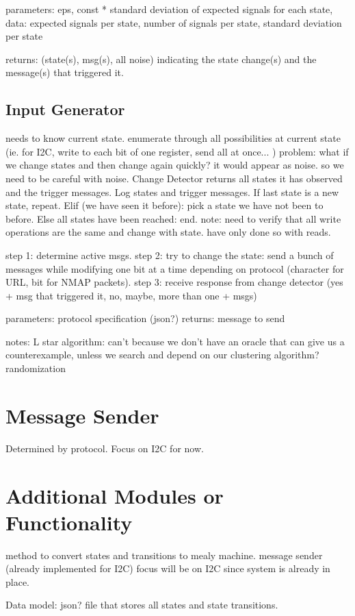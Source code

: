 \documentclass[11pt, a4paper]{article}
\begin{document}
parameters: eps, const * standard deviation of expected signals for each state,
data: expected signals per state, number of signals per state, standard deviation per state

returns: (state(s), msg(s), all noise) indicating the state change(s) and the message(s) that triggered it.

\subsection*{Input Generator}

needs to know current state.
enumerate through all possibilities at current state (ie. for I2C, write to each bit of one register, send all at once... )
problem: what if we change states and then change again quickly? it would appear as noise. so we need to be careful with noise.
Change Detector returns all states it has observed and the trigger messages.
Log states and trigger messages.
If last state is a new state, repeat. 
Elif (we have seen it before): pick a state we have not been to before.
Else all states have been reached: end.
note: need to verify that all write operations are the same and change with state. have only done so with reads.

step 1: determine active msgs.
step 2: try to change the state: send a bunch of messages while modifying one bit at a time depending on protocol (character for URL, bit for NMAP packets).
step 3: receive response from change detector (yes + msg that triggered it, no, maybe, more than one + msgs)

parameters: protocol specification (json?)
returns: message to send

notes:
L star algorithm: can't because we don't have an oracle that can give us a counterexample, unless we search and depend on our clustering algorithm?
randomization

\section*{Message Sender}
Determined by protocol.
Focus on I2C for now.

\section*{Additional Modules or Functionality}
method to convert states and transitions to mealy machine.
message sender (already implemented for I2C)
focus will be on I2C since system is already in place.

Data model: json? file that stores all states and state transitions.
\end{document}
